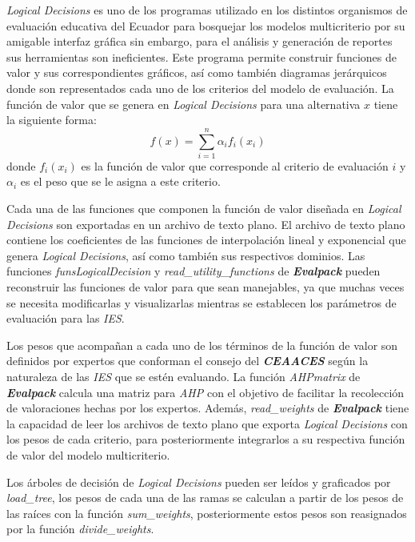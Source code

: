 {\it Logical Decisions\textregistered } es uno de los programas utilizado en los distintos organismos de evaluación educativa del Ecuador para bosquejar los modelos multicriterio por su  amigable interfaz gráfica sin embargo, para el análisis y generación de reportes sus herramientas son ineficientes. Este programa permite construir funciones de valor y sus correspondientes gráficos, así como también diagramas jerárquicos donde son representados cada uno de los criterios del modelo de evaluación. La función de valor que se genera en {\it Logical Decisions\textregistered } para una alternativa $x$ tiene la siguiente forma:
\[f(x)=\sum\limits_{i=1}^{n}\alpha_if_i(x_i)\]
donde $f_i(x_i)$ es la función de valor que corresponde al criterio de evaluación $i$ y $\alpha_i$ es el peso que se le asigna a este criterio.
 
Cada una de las funciones que componen la función de valor diseñada en {\it Logical Decisions\textregistered } son exportadas en un archivo de texto plano. El archivo de texto plano contiene los coeficientes de las funciones de interpolación lineal y exponencial que genera {\it Logical Decisions\textregistered }, así como también sus respectivos dominios. Las funciones {\it funsLogicalDecision} y {\it read\_utility\_functions} de \textit{\textbf{Evalpack}} pueden reconstruir las funciones de valor para que sean manejables, ya que muchas veces se necesita modificarlas y visualizarlas mientras se establecen los parámetros de evaluación para las {\it IES}.

Los pesos que acompañan a cada uno de los términos de la función de valor son definidos por expertos que conforman el consejo del \textit{\textbf{CEAACES}} según la naturaleza de las {\it IES} que se estén evaluando. La función {\it AHPmatrix} de \textit{\textbf{Evalpack}} calcula una matriz para {\it AHP} con el objetivo de facilitar la recolección de  valoraciones hechas por los expertos. Además, {\it read\_weights} de \textit{\textbf{Evalpack}} tiene la capacidad de leer los archivos de texto plano que exporta {\it Logical Decisions\textregistered } con los pesos de cada criterio, para posteriormente integrarlos a su respectiva función de valor del modelo multicriterio.  

Los árboles de decisión de {\it Logical Decisions\textregistered } pueden ser leídos y graficados por {\it load\_tree}, los pesos de cada una de las ramas se calculan a partir de los pesos de las raíces con la función {\it sum\_weights}, posteriormente estos pesos son reasignados por la función {\it divide\_weights}.     



